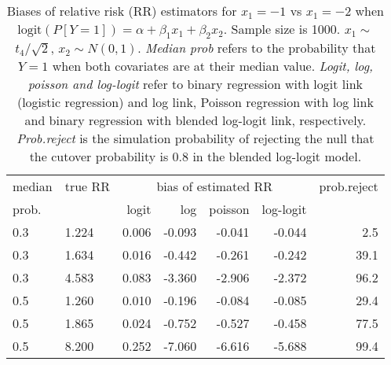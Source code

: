\documentclass[12pt,a4paper]{article}
\begin{document}
\begin{table}[H] 
\small\sf\centering 
\caption{Biases of relative risk (RR) estimators for $x_1=-1$ vs $x_1=-2$ when $\mbox{logit}(P[Y=1])=\alpha+\beta_1 x_1 + \beta_2 x_2$. Sample size is 1000. $x_1 \sim $$t_4/\sqrt{2}$, $x_2 \sim N(0,1)$. {\it Median prob} refers to the probability that $Y=1$ when both covariates are at their median value. {\it Logit, log, poisson and log-logit} refer to binary regression with logit link (logistic regression) and log link, Poisson regression with log link and binary regression with blended log-logit link, respectively. {\it Prob.reject} is the simulation probability of rejecting the null that the cutover probability is $0.8$ in the blended log-logit model.} 
\begin{tabular}{llrrrrr} 
\toprule 
median & true RR & \multicolumn{4}{c}{bias of estimated RR} & prob.reject \\ 
prob. & & logit & log & poisson & log-logit  & \\ \midrule 
0.3 & 1.224 & 0.006 & -0.093 & -0.041 & -0.044 &  2.5 \\  
0.3 & 1.634 & 0.016 & -0.442 & -0.261 & -0.242 & 39.1 \\  
0.3 & 4.583 & 0.083 & -3.360 & -2.906 & -2.372 & 96.2 \\  
0.5 & 1.260 & 0.010 & -0.196 & -0.084 & -0.085 & 29.4 \\  
0.5 & 1.865 & 0.024 & -0.752 & -0.527 & -0.458 & 77.5 \\  
0.5 & 8.200 & 0.252 & -7.060 & -6.616 & -5.688 & 99.4 \\  
\bottomrule 
\end{tabular} 
\end{table} 
\end{document}
